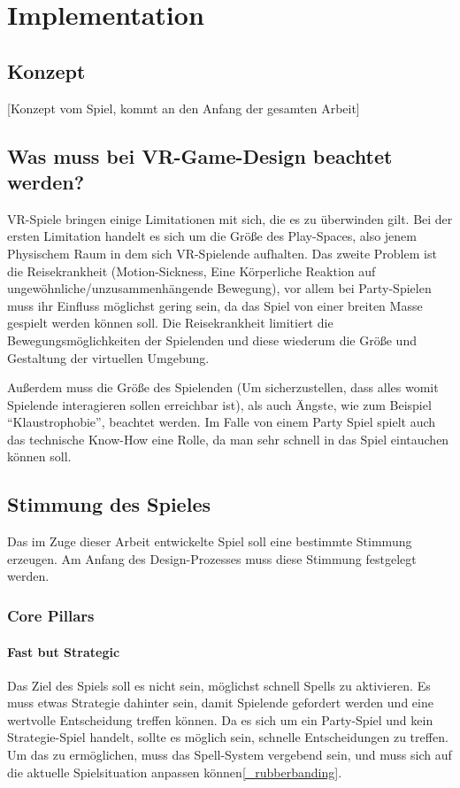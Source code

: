 \chapter{Implementation}

\section{Konzept}

[Konzept vom Spiel, kommt an den Anfang der gesamten Arbeit]

\section{Was muss bei VR-Game-Design beachtet werden?}

VR-Spiele bringen einige Limitationen mit sich, die es zu überwinden gilt. Bei der ersten Limitation handelt es sich um die Größe des Play-Spaces, also jenem Physischem Raum in dem sich VR-Spielende aufhalten. Das zweite Problem ist die Reisekrankheit (Motion-Sickness, Eine Körperliche Reaktion auf ungewöhnliche/unzusammenhängende Bewegung\cite[S. 533]{_art_of_gamedesign}), vor allem bei Party-Spielen muss ihr Einfluss möglichst gering sein, da das Spiel von einer breiten Masse gespielt werden können soll. Die Reisekrankheit limitiert die Bewegungsmöglichkeiten der Spielenden und diese wiederum die Größe und Gestaltung der virtuellen Umgebung.

Außerdem muss die Größe des Spielenden (Um sicherzustellen, dass alles womit Spielende interagieren sollen erreichbar ist), als auch Ängste, wie zum Beispiel "`Klaustrophobie"', beachtet werden. Im Falle von einem Party Spiel spielt auch das technische Know-How eine Rolle, da man sehr schnell in das Spiel eintauchen können soll.

\section{Stimmung des Spieles}
Das im Zuge dieser Arbeit entwickelte Spiel soll eine bestimmte Stimmung erzeugen. Am Anfang des Design-Prozesses muss diese Stimmung festgelegt werden.

\subsection{Core Pillars}

\subsubsection{Fast but Strategic}
Das Ziel des Spiels soll es nicht sein, möglichst schnell Spells zu aktivieren. Es muss etwas Strategie dahinter sein, damit Spielende gefordert werden und eine wertvolle Entscheidung treffen können. Da es sich um ein Party-Spiel und kein Strategie-Spiel handelt, sollte es möglich sein, schnelle Entscheidungen zu treffen. Um das zu ermöglichen, muss das Spell-System vergebend sein, und muss sich auf die aktuelle Spielsituation anpassen können\ref{_rubberbanding}. 

